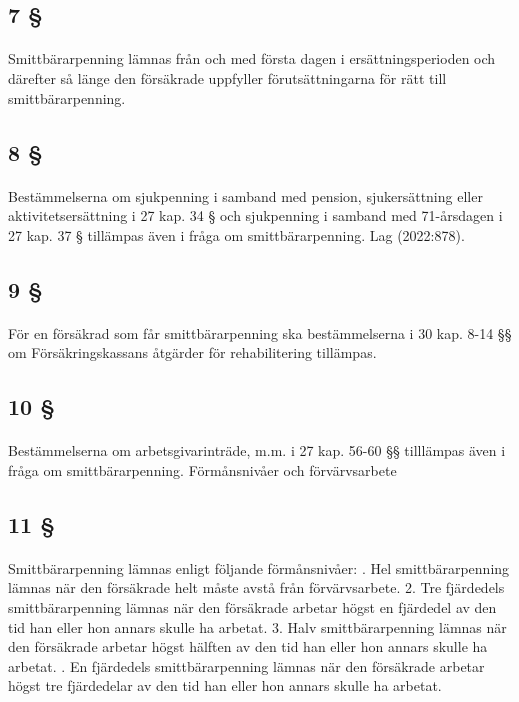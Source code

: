 \documentclass[a4paper,notitlepage,openany,10pt]{book}
\begin{document}
\subsection*{7 §}
\paragraph*{}
Smittbärarpenning lämnas från och med första dagen i ersättningsperioden och därefter så länge den försäkrade uppfyller förutsättningarna för rätt till smittbärarpenning.
\subsection*{8 §}
\paragraph*{}
Bestämmelserna om sjukpenning i samband med pension, sjukersättning eller aktivitetsersättning i 27 kap. 34 § och sjukpenning i samband med 71-årsdagen i 27 kap. 37 § tillämpas även i fråga om smittbärarpenning.
Lag (2022:878).
\subsection*{9 §}
\paragraph*{}
För en försäkrad som får smittbärarpenning ska bestämmelserna i 30 kap. 8-14 §§ om Försäkringskassans åtgärder för rehabilitering tillämpas.
\subsection*{10 §}
\paragraph*{}
Bestämmelserna om arbetsgivarinträde, m.m. i 27 kap. 56-60 §§ tilllämpas även i fråga om smittbärarpenning.
Förmånsnivåer och förvärvsarbete
\subsection*{11 §}
\paragraph*{}
Smittbärarpenning lämnas enligt följande förmånsnivåer:
. Hel smittbärarpenning lämnas när den försäkrade helt måste avstå från förvärvsarbete. 2. Tre fjärdedels smittbärarpenning lämnas när den försäkrade arbetar högst en fjärdedel av den tid han eller hon annars skulle ha arbetat. 3. Halv smittbärarpenning lämnas när den försäkrade arbetar högst hälften av den tid han eller hon annars skulle ha arbetat.
. En fjärdedels smittbärarpenning lämnas när den försäkrade arbetar högst tre fjärdedelar av den tid han eller hon annars skulle ha arbetat.
\end{document}
